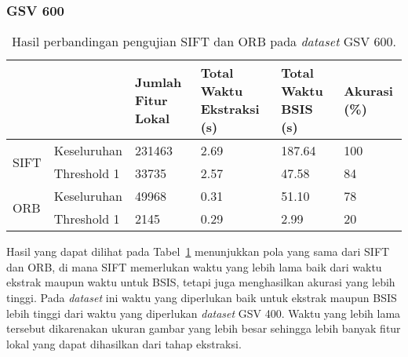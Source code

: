 \subsubsection{GSV 600}
\begin{table}[H]
	\centering
	\begin{tabular}{|p{}|p{}|p{}|p{}|p{}|p{}|}
		\hline
		&             & \textbf{Jumlah Fitur Lokal} & \textbf{Total Waktu Ekstraksi (s)} & \textbf{Total Waktu BSIS (s)} & \textbf{Akurasi (\%)} \\ \hline
		\multicolumn{1}{|l|}{\multirow{2}{*}{SIFT}} & Keseluruhan & 231463 & 2.69                             & 187.64                        & 100                   \\ \cline{2-6} 
		\multicolumn{1}{|l|}{}                      & Threshold 1 & 33735 & 2.57                             & 47.58                         & 84                    \\ \hline
		\multirow{2}{*}{ORB}                        & Keseluruhan & 49968 & 0.31                             & 51.10                         & 78                    \\ \cline{2-6} 
		& Threshold 1 & 2145 & 0.29                             & 2.99                          & 20                    \\ \hline
	\end{tabular}
	\caption{Hasil perbandingan pengujian SIFT dan ORB pada \textit{dataset} GSV 600.}
	\label{tab:perbandingan_gsv600}
\end{table}
Hasil yang dapat dilihat pada Tabel~\ref{tab:perbandingan_gsv600} menunjukkan pola yang sama dari SIFT dan ORB, di mana SIFT memerlukan waktu yang lebih lama baik dari waktu ekstrak maupun waktu untuk BSIS, tetapi juga menghasilkan akurasi yang lebih tinggi. Pada \textit{dataset} ini waktu yang diperlukan baik untuk ekstrak maupun BSIS lebih tinggi dari waktu yang diperlukan \textit{dataset} GSV 400. Waktu yang lebih lama tersebut dikarenakan ukuran gambar yang lebih besar sehingga lebih banyak fitur lokal yang dapat dihasilkan dari tahap ekstraksi.


